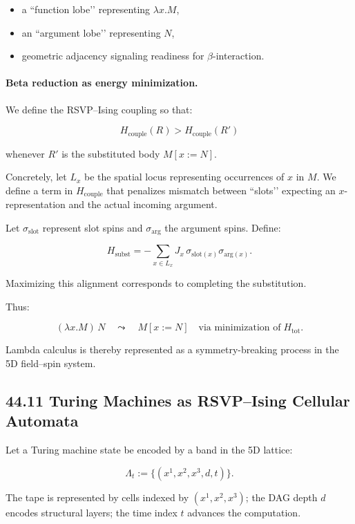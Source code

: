 \documentclass[12pt,letterpaper]{article}
\theoremstyle{remark}
\begin{document}
\begin{itemize}
    \item a ``function lobe’’ representing $\lambda x.M$,
    \item an ``argument lobe’’ representing $N$,
    \item geometric adjacency signaling readiness for $\beta$-interaction.
\end{itemize}

\paragraph{Beta reduction as energy minimization.}
We define the RSVP–Ising coupling so that:

\[
H_{\text{couple}}(R) > H_{\text{couple}}(R')
\]

whenever $R'$ is the substituted body $M[x:=N]$.

Concretely, let $L_x$ be the spatial locus representing occurrences of $x$ in $M$. We define a term in $H_{\text{couple}}$ that penalizes mismatch between ``slots’’ expecting an $x$-representation and the actual incoming argument.

Let $\sigma_{\text{slot}}$ represent slot spins and $\sigma_{\text{arg}}$ the argument spins. Define:

\[
H_{\text{subst}} = -\sum_{x\in L_x} J_x\, \sigma_{\text{slot}(x)} \sigma_{\text{arg}(x)}.
\]

Maximizing this alignment corresponds to completing the substitution.

Thus:

\[
(\lambda x. M)\,N 
\quad\leadsto\quad
M[x:=N]
\quad\text{via minimization of}\; H_{\text{tot}}.
\]

Lambda calculus is thereby represented as a symmetry-breaking process in the 5D field–spin system.

\subsection{44.11 Turing Machines as RSVP–Ising Cellular Automata}

Let a Turing machine state be encoded by a band in the 5D lattice:

\[
\Lambda_{t} := \{(x^1,x^2,x^3,d,t)\}.
\]

The tape is represented by cells indexed by $(x^1,x^2,x^3)$; the DAG depth $d$ encodes structural layers; the time index $t$ advances the computation.
\end{document}
